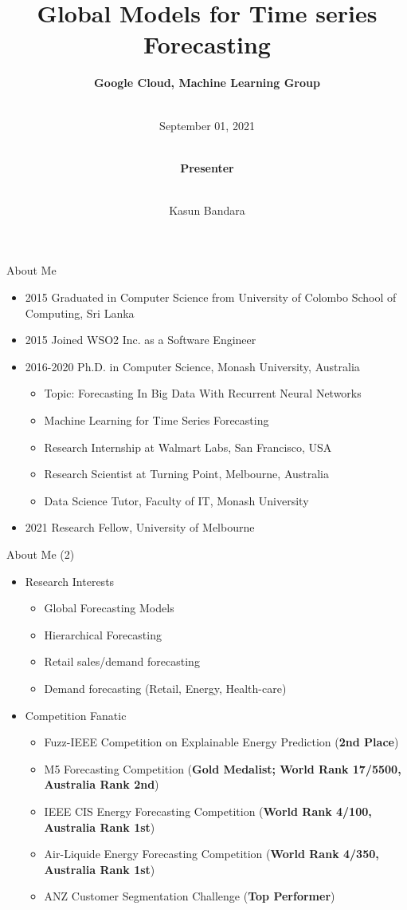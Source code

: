 \documentclass{beamer}
\title[Global Models]{Global Models for Time series Forecasting}
\author[Kasun Bandara]{\textbf{Google Cloud, Machine Learning Group} \and \\ \footnotesize September 01, 2021
\and \\\vspace{3mm} \textbf{\scriptsize Presenter} \and \\\vspace{2mm} Kasun Bandara
}
\institute{School of Computing and Information Systems \\\vspace{1mm} Melbourne Centre For Data Science \\\vspace{1mm} University of Melbourne}
\date[September 01, 2021]{}
\begin{document}
\begin{frame}[plain]
  \titlepage
\end{frame}

\begin{frame}{About Me}
\begin{itemize}
\item 2015 Graduated in Computer Science from University of Colombo School of Computing, Sri Lanka
\item 2015 Joined WSO2 Inc. as a Software Engineer
\item 2016-2020 Ph.D. in Computer Science, Monash University, Australia
 \begin{itemize}
  \item Topic: Forecasting In Big Data With Recurrent Neural Networks
  \item Machine Learning for Time Series Forecasting
  \item Research Internship at Walmart Labs, San Francisco, USA
  \item Research Scientist at Turning Point, Melbourne, Australia
  \item Data Science Tutor, Faculty of IT, Monash University
 \end{itemize}
\item 2021 Research Fellow, University of Melbourne
\end{itemize}
\end{frame}

\begin{frame}{About Me (2)}
\begin{itemize}
\item Research Interests
\begin{itemize}
 \item Global Forecasting Models
  \item Hierarchical Forecasting
  \item Retail sales/demand forecasting
  \item Demand forecasting (Retail, Energy, Health-care)
  \end{itemize}
\item Competition Fanatic
  \begin{itemize}
  \item Fuzz-IEEE Competition on Explainable Energy Prediction (\textbf{2nd Place})
  \item M5 Forecasting Competition (\textbf{Gold Medalist; World Rank 17/5500, Australia Rank 2nd})
  \item IEEE CIS Energy Forecasting Competition (\textbf{World Rank 4/100, Australia Rank 1st})
  \item Air-Liquide Energy Forecasting Competition (\textbf{World Rank 4/350, Australia Rank 1st})
  \item ANZ Customer Segmentation Challenge (\textbf{Top Performer})
  \end{itemize}
\end{itemize}
\end{frame}
\end{document}
